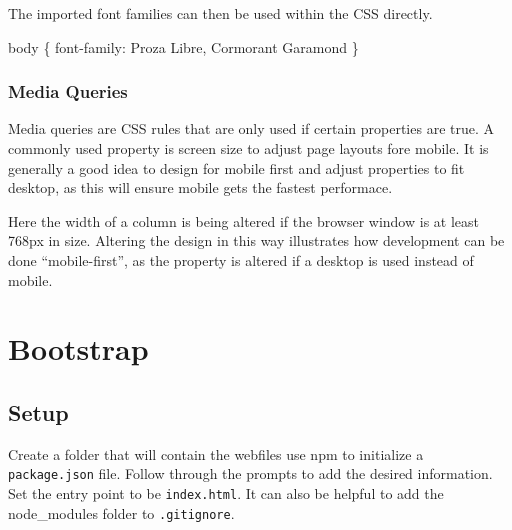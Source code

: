 \documentclass[]{book}
\newenvironment{Shaded}{\begin{snugshade}}{\end{snugshade}}
\newcommand{\KeywordTok}[1]{\textcolor[rgb]{0.13,0.29,0.53}{\textbf{#1}}}
\newcommand{\ExtensionTok}[1]{#1}
\newcommand{\NormalTok}[1]{#1}
\begin{document}
The imported font families can then be used within the CSS directly.

\begin{Shaded}
\begin{Highlighting}[]
\ExtensionTok{body}\NormalTok{ \{}
    \ExtensionTok{font-family}\NormalTok{: Proza Libre, Cormorant Garamond}
\NormalTok{\}}
\end{Highlighting}
\end{Shaded}

\subsection{Media Queries}\label{media-queries}

Media queries are CSS rules that are only used if certain properties are
true. A commonly used property is screen size to adjust page layouts
fore mobile. It is generally a good idea to design for mobile first and
adjust properties to fit desktop, as this will ensure mobile gets the
fastest performace.

Here the width of a column is being altered if the browser window is at
least 768px in size. Altering the design in this way illustrates how
development can be done ``mobile-first'', as the property is altered if
a desktop is used instead of mobile.

\begin{Shaded}
\end{Shaded}

\chapter{Bootstrap}\label{bootstrap}

\section{Setup}\label{setup}

Create a folder that will contain the webfiles use npm to initialize a
\texttt{package.json} file. Follow through the prompts to add the
desired information. Set the entry point to be \texttt{index.html}. It
can also be helpful to add the node\_modules folder to
\texttt{.gitignore}.
\end{document}
